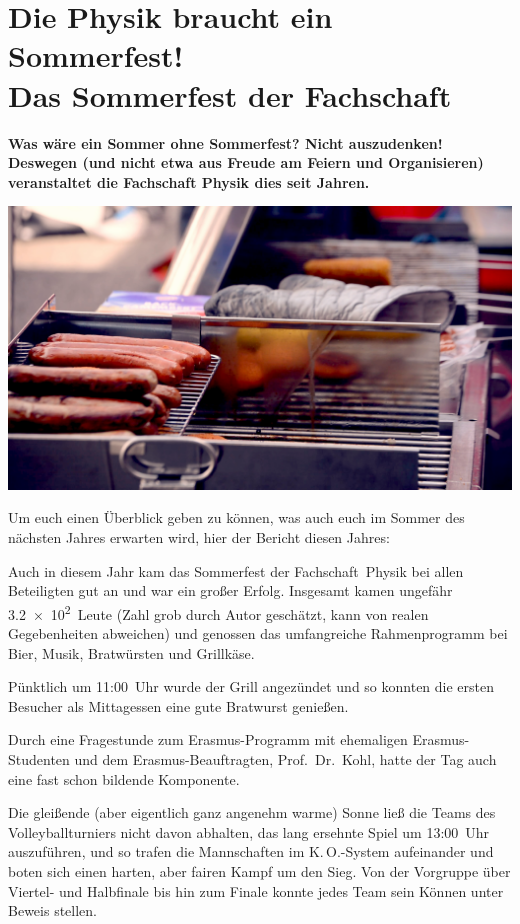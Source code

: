 \section[Das Sommerfest der Fachschaft]{Die Physik braucht ein Sommerfest!\\Das Sommerfest der Fachschaft}
\begin{multicols*}{2}
\setlength{\parskip}{1.6\parskip}

\textbf{Was wäre ein Sommer ohne Sommerfest?
	Nicht auszudenken!
	Deswegen (und nicht etwa aus Freude am Feiern und Organisieren) veranstaltet die Fachschaft Physik dies seit Jahren.}

\includegraphics[width=\columnwidth]{res/sommerfest_grill.png}

Um euch einen Überblick geben zu können, was auch euch im Sommer des nächsten Jahres erwarten wird, hier der Bericht diesen Jahres:

Auch in diesem Jahr kam das Sommerfest der Fachschaft~Physik bei allen Beteiligten gut an und war ein großer Erfolg.
Insgesamt kamen ungefähr \num{3,2e2}~Leute (Zahl grob durch Autor geschätzt, kann von realen Gegebenheiten abweichen) und genossen das umfangreiche Rahmenprogramm bei Bier, Musik, Bratwürsten und Grillkäse.

Pünktlich um 11:00~Uhr wurde der Grill angezündet und so konnten die ersten Besucher als Mittagessen eine gute Bratwurst genießen.

Durch eine Fragestunde zum Erasmus-Programm mit ehemaligen Erasmus-Studenten und dem Erasmus-Beauftragten, Prof.\ Dr.\ Kohl, hatte der Tag auch eine fast schon bildende Komponente.

Die gleißende (aber eigentlich ganz angenehm warme) Sonne ließ die Teams des Volleyballturniers nicht davon abhalten, das lang ersehnte Spiel um 13:00~Uhr auszuführen, und so trafen die Mannschaften im K.\,O.-System aufeinander und boten sich einen harten, aber fairen Kampf um den Sieg.
Von der Vorgruppe über Viertel- und Halbfinale bis hin zum Finale konnte jedes Team sein Können unter Beweis stellen.


\end{multicols*}
